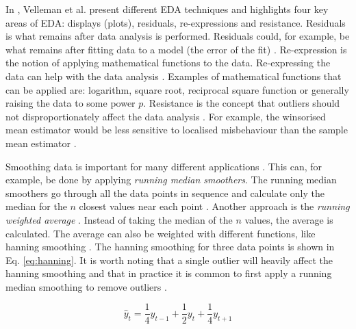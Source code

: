 In \cite{Velleman1981}, Velleman et al. present different EDA techniques and highlights four key areas of EDA: displays (plots), residuals, re-expressions and resistance.
Residuals is what remains after data analysis is performed.
Residuals could, for example, be what remains after fitting data to a model (the error of the fit) \cite{Velleman1981}.
Re-expression is the notion of applying mathematical functions to the data.
Re-expressing the data can help with the data analysis \cite{Hoaglin2003, Velleman1981}.
Examples of mathematical functions that can be applied are: logarithm, square root, reciprocal square function or generally raising the data to some power $p$.
Resistance is the concept that outliers should not disproportionately affect the data analysis \cite{Hoaglin2003, Velleman1981}.
For example, the winsorised mean estimator would be less sensitive to localised misbehaviour than the sample mean estimator \cite{Tukey1977}.

Smoothing data is important for many different applications \cite{Bradley1997, Pang2002, Quinlan1992, Velleman1981}.
This can, for example, be done by applying \emph{running median smoothers}.
The running median smoothers go through all the data points in sequence and calculate only the median for the $n$ closest values near each point \cite{Velleman1981}.
Another approach is the \emph{running weighted average} \cite{Velleman1981}.
Instead of taking the median of the $n$ values, the average is calculated.
The average can also be weighted with different functions, like hanning smoothing \cite{Velleman1981}.
The hanning smoothing for three data points is shown in Eq. \ref{eq:hanning}.
It is worth noting that a single outlier will heavily affect the hanning smoothing and that in practice it is common to first apply a running median smoothing to remove outliers \cite{Velleman1981}.

\begin{equation}
    \hat y_t = \frac{1}{4} y_{t-1} + \frac{1}{2} y_t + \frac{1}{4} y_{t + 1} 
    \label{eq:hanning}
\end{equation}